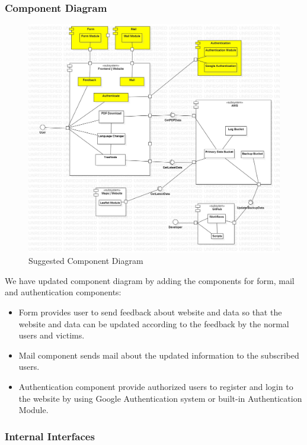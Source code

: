 \subsubsection{Component Diagram}

\begin{figure}[H]
  \centering
  \includegraphics[width=\linewidth]{img/component-diagram-s5.jpg}
  \caption{Suggested Component Diagram}
\end{figure}

We have updated component diagram by adding the components for form, mail and authentication components:
\begin{itemize}
  \item Form provides user to send feedback about website and data so that the website and data can be updated according to the feedback by the normal users and victims.
  \item Mail component sends mail about the updated information to the subscribed users.
  \item Authentication component provide authorized users to register and login to the website by using Google Authentication system or built-in Authentication Module.
\end{itemize}

\subsubsection{Internal Interfaces}

